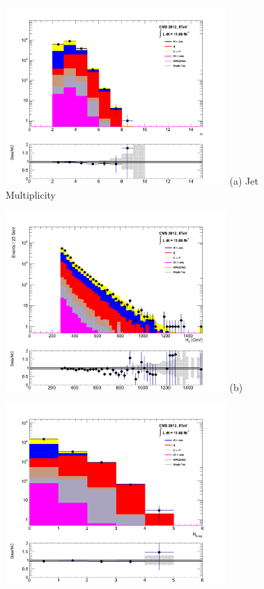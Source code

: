 \begin{figure}[ht]
\centering
\begin{minipage}{.48\textwidth}
\centering
\includegraphics[width = 3.3in]{plots/had_njet_datamc.pdf}
(a) Jet Multiplicity
\end{minipage}
\begin{minipage}{.48\textwidth}
\centering
\includegraphics[width = 3.3in]{plots/had_ht_datamc.pdf}
(b) \theht
\end{minipage}
\begin{minipage}{.48\textwidth}
\centering
\includegraphics[width = 3.3in]{plots/had_nbtag_datamc.pdf}

\end{minipage}
\end{figure}

